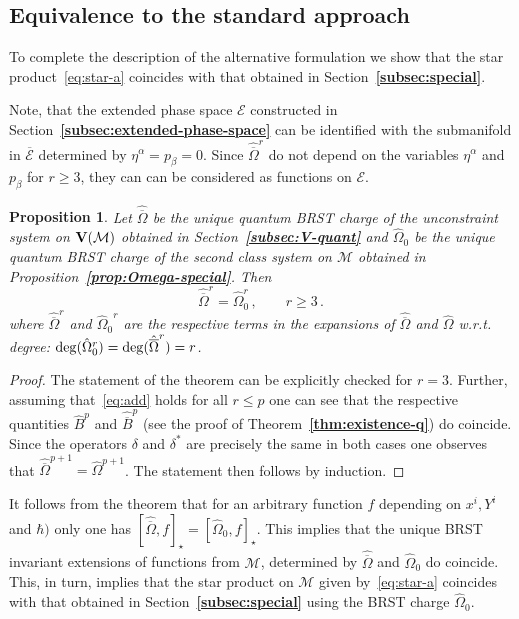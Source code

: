 \documentclass[a4paper,11pt]{amsart}
\newtheorem{prop}[thm]{Proposition}
\numberwithin{thm}{section} %
\numberwithin{equation}{section} %
\numberwithin{figure}{section} %
\newcommand{\bref}[1]{{\bf \ref{#1}}}
\newcommand{\qcommut}[2]{[#1,#2]_\star}
\renewcommand{\deg}[1]{{\rm deg}(#1)}
\renewcommand{\:}{{\rm\, :\,}}
\def\bar{\overline}
\def\manM{{\mathcal M}}
\def\E{{ \mathcal E}}
\def\V{{\bf V}}
\begin{document}
\subsection{Equivalence to the standard approach}
To complete the description of the alternative formulation we show
that the star product~\eqref{eq:star-a} coincides with that
obtained in Section~\bref{subsec:special}.

Note, that the extended phase space $\E$
constructed in Section~\bref{subsec:extended-phase-space}
can be identified with the submanifold in $\bar\E$ determined by
$\eta^\alpha=p_\beta=0$.  Since ${\hat{\bar\Omega}}^r$
do not depend on the variables $\eta^\alpha$ and $p_\beta$
for $r \geq 3$, they can can be considered as functions on $\E$.
\begin{prop}
Let $\hat{\bar\Omega}$ be the unique quantum BRST charge
of the unconstraint system on $\V(\manM)$
obtained in Section~\bref{subsec:V-quant}
and ${\hat\Omega}_0$ be the unique quantum BRST charge of the second
class system on $\manM$ obtained in
Proposition~\bref{prop:Omega-special}. Then
\begin{equation}
\label{eq:add}
  {\hat{\bar\Omega}}^r={\hat\Omega}_0^r\,, \qquad r \geq 3\,.
\end{equation}
where  ${{\hat{\bar\Omega}}}^r$ and ${{\hat\Omega}_0}^r$
are the respective terms in the expansions of ${{\hat{\bar\Omega}}}$ and
${{\hat\Omega}}$ w.r.t. degree:
$\deg{{\hat\Omega}^r_0}=\deg{{\hat{\bar\Omega}}^r}=r$.
\end{prop}
\begin{proof}
The statement of the theorem can be explicitly checked for $r=3$.
Further, assuming that~\eqref{eq:add} holds for all $r \leq p$
one can see that the respective quantities ${\hat B}^p$
and ${\hat{\bar B}}^p$ (see the proof of
Theorem~\bref{thm:existence-q}) do coincide.
Since the operators $\delta$ and $\delta^{*}$ are precisely the same
in both cases one observes that
${\hat{\bar\Omega}}^{p+1}={\hat\Omega}^{p+1}$. The
statement then follows by induction.
\end{proof}
It follows from the theorem that for
an arbitrary function $f$ depending on $x^i,Y^i$ and $\hbar)$ only
one has $\qcommut{\hat{\bar\Omega}}{f}=\qcommut{{\hat{\Omega}}_0}{f}$.
This implies that the unique BRST invariant extensions
of functions from $\manM$, determined by
${{\hat{\bar\Omega}}}$ and
${{\hat\Omega}_0}$ do coincide. This, in turn, implies that
the star product on $\manM$ given by~\eqref{eq:star-a} coincides
with that obtained in Section~\bref{subsec:special} using
the BRST charge $\hat\Omega_0$.
\end{document}

